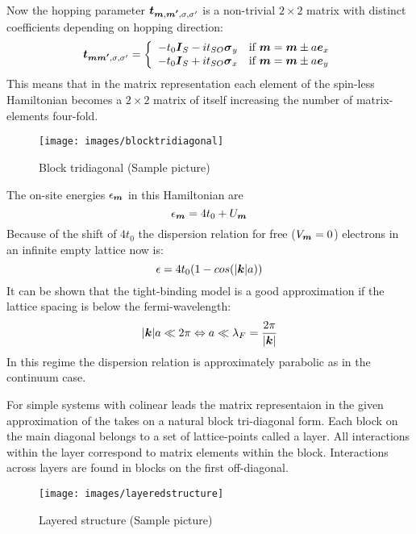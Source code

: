 Now the hopping parameter $\boldsymbol{t}_{\boldsymbol{m},\boldsymbol{m'},\sigma,\sigma '}$ is a non-trivial $2 \times 2$ matrix with distinct coefficients depending on hopping direction:
\begin{align}
	\boldsymbol{t}_{\boldsymbol{m}\boldsymbol{m'},\sigma,\sigma '} = \left\{ \begin{array}[c]{cl} -t_0\boldsymbol{I}_S - i t_{SO} \boldsymbol{\sigma}_y & \text{if } \boldsymbol{m} = \boldsymbol{m} \pm a \boldsymbol{e}_{x} \\
		-t_0\boldsymbol{I}_S + i t_{SO} \boldsymbol{\sigma}_x & \text{if } \boldsymbol{m} = \boldsymbol{m} \pm a \boldsymbol{e}_{y} \end{array} \right.
	\label{eqn:tsohopping}
\end{align}
This means that in the matrix representation each element of the spin-less Hamiltonian becomes a $2 \times 2$ matrix of itself increasing the number of matrix-elements four-fold.
\begin{figure}[h!]
\centering
\texttt{[image: images/blocktridiagonal]}
\caption{Block tridiagonal (Sample picture)}
\label{fig:blocktridiagonal}
\end{figure}
The on-site energies $\epsilon_{\boldsymbol{m}}$ in this Hamiltonian are
\begin{equation}
\epsilon_{\boldsymbol{m}} = 4t_0 + U_{\boldsymbol{m}} 
\end{equation}
Because of the shift of $4 t_0$ the dispersion relation for free ($V_{\boldsymbol{m}}=0$) electrons in an infinite empty lattice now is:
\begin{equation}
\epsilon = 4t_0(1-cos(\lvert\boldsymbol{k}\rvert a))
\end{equation}
It can be shown that the tight-binding model is a good approximation if the lattice spacing is below the fermi-wavelength:
\begin{equation}
\lvert\boldsymbol{k}\rvert a \ll  2\pi \Leftrightarrow a \ll \lambda_F = \frac{2\pi}{\lvert\boldsymbol{k}\rvert}
\end{equation}
In this regime the dispersion relation is approximately parabolic as in the continuum case.\cite{Metalidis2007Thesis}

For simple systems with colinear leads the matrix representaion in the given approximation of the \hamil{} takes on a natural block tri-diagonal form. Each block on the main diagonal belongs to a set of lattice-points called a layer. All interactions within the layer correspond to matrix elements within the block. Interactions across layers are found in blocks on the first off-diagonal\cite{AnLunNik2008}.
\begin{figure}[h!]
\centering
\texttt{[image: images/layeredstructure]}
\caption{Layered structure (Sample picture)}
\label{fig:layered}
\end{figure}
